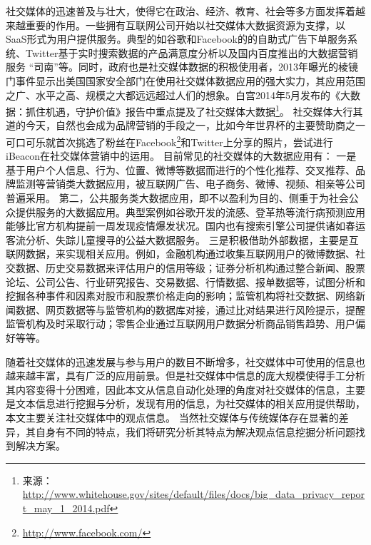 社交媒体的迅速普及与壮大，使得它在政治、经济、教育、社会等多方面发挥着越来越重要的作用。一些拥有互联网公司开始以社交媒体大数据资源为支撑，以SaaS形式为用户提供服务。典型的如谷歌和Facebook的的自助式广告下单服务系统、Twitter基于实时搜索数据的产品满意度分析以及国内百度推出的大数据营销服务 “司南”等。同时，政府也是社交媒体数据的积极使用者，2013年曝光的棱镜门事件显示出美国国家安全部门在使用社交媒体数据应用的强大实力，其应用范围之广、水平之高、规模之大都远远超过人们的想象。白宫2014年5月发布的《大数据：抓住机遇，守护价值》报告中重点提及了社交媒体大数据\footnote{来源：\url{http://www.whitehouse.gov/sites/default/files/docs/big\_data\_privacy\_report\_may\_1\_2014.pdf}}。
社交媒体大行其道的今天，自然也会成为品牌营销的手段之一，比如今年世界杯的主要赞助商之一可口可乐就首次挑选了粉丝在Facebook\footnote{\url{http://www.facebook.com/}}和Twitter上分享的照片，尝试进行iBeacon在社交媒体营销中的运用。
目前常见的社交媒体的大数据应用有：
一是基于用户个人信息、行为、位置、微博等数据而进行的个性化推荐、交叉推荐、品牌监测等营销类大数据应用，被互联网广告、电子商务、微博、视频、相亲等公司普遍采用。
第二，公共服务类大数据应用，即不以盈利为目的、侧重于为社会公众提供服务的大数据应用。典型案例如谷歌开发的流感、登革热等流行病预测应用能够比官方机构提前一周发现疫情爆发状况。国内也有搜索引擎公司提供诸如春运客流分析、失踪儿童搜寻的公益大数据服务。
三是积极借助外部数据，主要是互联网数据，来实现相关应用。例如，金融机构通过收集互联网用户的微博数据、社交数据、历史交易数据来评估用户的信用等级；证券分析机构通过整合新闻、股票论坛、公司公告、行业研究报告、交易数据、行情数据、报单数据等，试图分析和挖掘各种事件和因素对股市和股票价格走向的影响；监管机构将社交数据、网络新闻数据、网页数据等与监管机构的数据库对接，通过比对结果进行风险提示，提醒监管机构及时采取行动；零售企业通过互联网用户数据分析商品销售趋势、用户偏好等等。

随着社交媒体的迅速发展与参与用户的数目不断增多，社交媒体中可使用的信息也越来越丰富，具有广泛的应用前景。但是社交媒体中信息的庞大规模使得手工分析其内容变得十分困难，因此本文从信息自动化处理的角度对社交媒体的信息，主要是文本信息进行挖掘与分析，发现有用的信息，为社交媒体的相关应用提供帮助，本文主要关注社交媒体中的观点信息。
当然社交媒体与传统媒体存在显著的差异，其自身有不同的特点，我们将研究分析其特点为解决观点信息挖掘分析问题找到解决方案。


